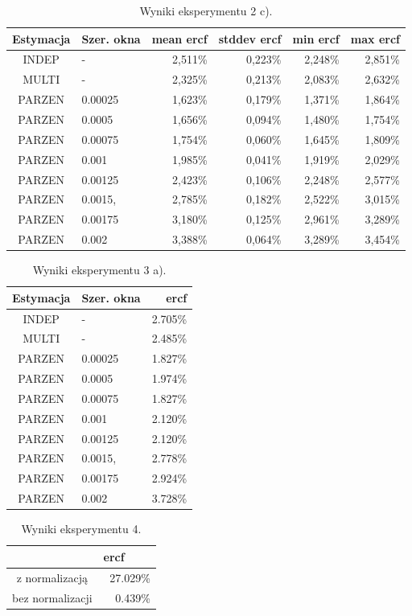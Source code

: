 \documentclass{article}
\begin{document}
	\begin{table}[H] \centering
		\begin{tabular}{c|l|r|r|r|r}
			Estymacja & Szer. okna & mean ercf & stddev ercf & min ercf & max ercf \\ \hline
			INDEP  & -       & 2,511\%	& 0,223\%	& 2,248\%	& 2,851\% \\ 
			MULTI  & -       & 2,325\%	& 0,213\%	& 2,083\%	& 2,632\% \\ 
			PARZEN & 0.00025 & 1,623\%	& 0,179\%	& 1,371\%	& 1,864\% \\ 
			PARZEN & 0.0005  & 1,656\%	& 0,094\%	& 1,480\%	& 1,754\% \\
			PARZEN & 0.00075 & 1,754\%	& 0,060\%	& 1,645\%	& 1,809\% \\
			PARZEN & 0.001   & 1,985\%	& 0,041\%	& 1,919\%	& 2,029\% \\ 
			PARZEN & 0.00125 & 2,423\%	& 0,106\%	& 2,248\%	& 2,577\% \\ 
			PARZEN & 0.0015, & 2,785\%	& 0,182\%	& 2,522\%	& 3,015\% \\ 
			PARZEN & 0.00175 & 3,180\%	& 0,125\%	& 2,961\%	& 3,289\% \\ 
			PARZEN & 0.002   & 3,388\%	& 0,064\%	& 3,289\%	& 3,454\% 
		\end{tabular}
		\caption{Wyniki eksperymentu 2 c). }
		\label{tab:2a}
	\end{table}

	\begin{table}[H] \centering
		\begin{tabular}{c|l|r}
			Estymacja & Szer. okna & ercf \\ \hline
			INDEP  & -       & 2.705\% \\ 
			MULTI  & -       & 2.485\% \\ 
			PARZEN & 0.00025 & 1.827\% \\ 
			PARZEN & 0.0005  & 1.974\% \\
			PARZEN & 0.00075 & 1.827\% \\
			PARZEN & 0.001   & 2.120\% \\ 
			PARZEN & 0.00125 & 2.120\% \\ 
			PARZEN & 0.0015, & 2.778\% \\ 
			PARZEN & 0.00175 & 2.924\% \\ 
			PARZEN & 0.002   & 3.728\%
		\end{tabular}
		\caption{Wyniki eksperymentu 3 a). }
		\label{tab:3a}
	\end{table}

	\begin{table}[H] \centering
		\begin{tabular}{c|r}
			 & ercf\ \ \ \ \\ \hline
			z normalizacją    & 27.029\% \\ 
			bez normalizacji  & 0.439\% \\ 
		\end{tabular}
		\caption{Wyniki eksperymentu 4. }
		\label{tab:4}
	\end{table}
	
\end{document}
